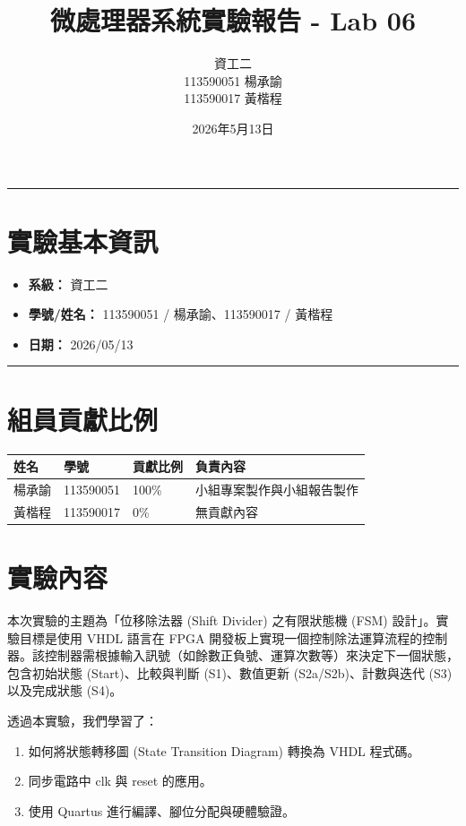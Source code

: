 \documentclass[12pt, a4paper]{article}
\title{微處理器系統實驗報告 - Lab 06}
\author{資工二 \\ 113590051 楊承諭 \\ 113590017 黃楷程}
\date{2026年5月13日}
\begin{document}
\maketitle
\hrule

\section*{實驗基本資訊}
\begin{itemize}
    \item \textbf{系級：} 資工二
    \item \textbf{學號/姓名：} 113590051 / 楊承諭、113590017 / 黃楷程
    \item \textbf{日期：} 2026/05/13
\end{itemize}

\hrule

\section*{組員貢獻比例}
\begin{table}[H]
    \centering
    \begin{tabular}{@{}llll@{}}
        \toprule
        \textbf{姓名} & \textbf{學號} & \textbf{貢獻比例} & \textbf{負責內容} \\ \midrule
        楊承諭 & 113590051 & 100\% & 小組專案製作與小組報告製作 \\
        黃楷程 & 113590017 & 0\% & 無貢獻內容 \\ \bottomrule
    \end{tabular}
\end{table}

\section{實驗內容}
本次實驗的主題為「位移除法器 (Shift Divider) 之有限狀態機 (FSM) 設計」。實驗目標是使用 VHDL 語言在 FPGA 開發板上實現一個控制除法運算流程的控制器。該控制器需根據輸入訊號（如餘數正負號、運算次數等）來決定下一個狀態，包含初始狀態 (Start)、比較與判斷 (S1)、數值更新 (S2a/S2b)、計數與迭代 (S3) 以及完成狀態 (S4)。

透過本實驗，我們學習了：
\begin{enumerate}
    \item 如何將狀態轉移圖 (State Transition Diagram) 轉換為 VHDL 程式碼。
    \item 同步電路中 clk 與 reset 的應用。
    \item 使用 Quartus 進行編譯、腳位分配與硬體驗證。
\end{enumerate}
\end{document}
